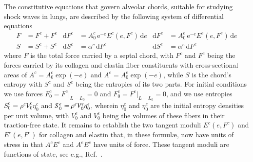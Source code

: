 The constitutive equations that govern alveolar chords, suitable for studying shock waves in lungs, are described by the following system of differential equations
\begin{subequations}
    \label{septalChordCEs}
    \begin{align}
    F & = F^c + F^e &
    \mathrm{d} F^c & = A_0^c \, \mathrm{e}^{-e} E^c ( e, F^c ) \, \mathrm{d}e & 
    \mathrm{d} F^e & = A_0^e \, \mathrm{e}^{-e} E^e ( e, F^e ) \, \mathrm{d}e \\
    S & = S^c + S^e & 
    \mathrm{d} S^c & = \alpha^c \, \mathrm{d} F^c & 
    \mathrm{d} S^e & = \alpha^e \, \mathrm{d} F^e
    \end{align}
\end{subequations}  
where $F$ is the total force carried by a septal chord, with $F^c$ and $F^e$ being the forces carried by its collagen and elastin fiber constituents with cross-sectional areas of $A^c = A^c_0 \exp (-e)$ and $A^e = A^e_0 \exp (-e)$, while $S$ is the chord's entropy with $S^c$ and $S^e$ being the entropies of its two parts.  For initial conditions we use forces $F^c_0 = F^c |_{L = L_0} = 0$ and $F^e_0 = F^e |_{L = L_0} = 0$, and we use entropies $S_0^c = \rho^c V_0^c \eta_0^c$ and $S_0^e \defeq \rho^e V_0^e \eta_0^e$, wherein $\eta_0^c$ and $\eta_0^e$ are the initial entropy densities per unit volume, with $V_0^c$ and $V_0^e$ being the volumes of these fibers in their traction-free state.  It remains to establish the two tangent moduli $E^c (e, F^c)$ and $E^e (e, F^e)$ for collagen and elastin that, in these formul\ae, now have units of stress in that $A^cE^c$ and $A^eE^c$ have units of force.  These tangent moduli are functions of state, see e.g., Ref.~\cite{FreedRajagopal16}.

